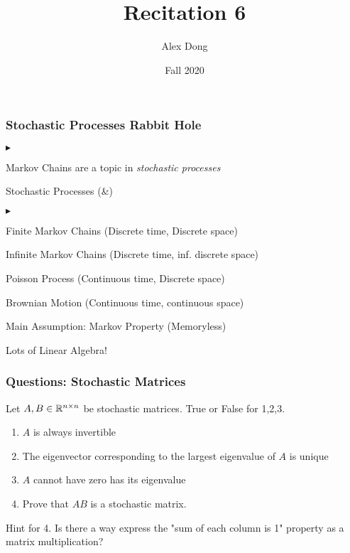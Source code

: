 \documentclass{beamer}
\title{Recitation 6}
\author{Alex Dong}
\institute{CDS, NYU}
\date{Fall 2020}
\renewenvironment{itemize}
\renewenvironment{enumerate}%
{\begin{list}{\arabic{enumi}.}%
      {\setlength{\leftmargin}{2.5em}%
       \setlength{\itemsep}{-\parsep}%
       \setlength{\topsep}{-\parskip}%
       \usecounter{enumi}}%
 }{\end{list}}
\renewenvironment{itemize}%
{\begin{list}{$\blacktriangleright$}%
      {\setlength{\leftmargin}{2.5em}%
       \setlength{\itemsep}{-\parsep}%
       \setlength{\topsep}{-\parskip}%
       \usecounter{enumi}}%
 }{\end{list}}
\begin{document}
\frame{\titlepage} 

\begin{frame}
\frametitle{Stochastic Processes Rabbit Hole}
\begin{itemize}
\item Markov Chains are a topic in \textit{stochastic processes}
\item Stochastic Processes (\&)
\begin{itemize}
\item Finite Markov Chains (Discrete time, Discrete space)
\item Infinite Markov Chains (Discrete time, inf. discrete space)
\item Poisson Process (Continuous time, Discrete space)
\item Brownian Motion (Continuous time, continuous space)
\end{itemize}
\item Main Assumption: Markov Property (Memoryless)
\item Lots of Linear Algebra!
\end{itemize}
\end{frame}



\begin{frame}
\frametitle{Questions: Stochastic Matrices}
Let $A,B\in \mathbb{R}^{n\times n}$ be  stochastic matrices.
True or False for 1,2,3.
\begin{enumerate}
\item $A$ is always invertible
\item The eigenvector corresponding to the largest eigenvalue of $A$ is unique
\item $A$ cannot have zero has its eigenvalue
\item Prove that $AB$ is a stochastic matrix.
\end{enumerate}

Hint for 4. Is there a way express the "sum of each column is 1" property as a matrix multiplication?
\end{frame}
\end{document}
